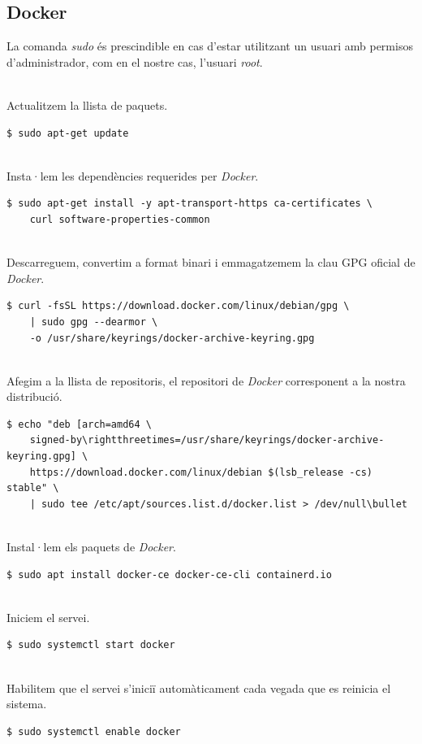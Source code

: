 \clearpage
\subsection*{\gls{Docker}}\label{subsec:docker-installation}

\begin{tcolorbox}[colback=red!5!white, colframe=red!75!black, title=sudo]
    La comanda \textit{sudo} és prescindible en cas d'estar utilitzant un usuari amb permisos d'administrador, com en el nostre cas, l'usuari \textit{root}.
\end{tcolorbox}

\noindent \\
Actualitzem la llista de paquets.
\begin{verbatim}
$ sudo apt-get update
\end{verbatim}

\noindent \\
Insta·lem les dependències requerides per \textit{\gls{Docker}}.
\begin{verbatim}
$ sudo apt-get install -y apt-transport-https ca-certificates \
    curl software-properties-common
\end{verbatim}

\noindent \\
Descarreguem, convertim a format binari i emmagatzemem la clau GPG oficial de \textit{\gls{Docker}}.
\begin{verbatim}
$ curl -fsSL https://download.docker.com/linux/debian/gpg \
    | sudo gpg --dearmor \
    -o /usr/share/keyrings/docker-archive-keyring.gpg
\end{verbatim}

\noindent \\
Afegim a la llista de repositoris, el repositori de \textit{\gls{Docker}} corresponent a la nostra distribució.
\begin{verbatim}
$ echo "deb [arch=amd64 \
    signed-by\rightthreetimes=/usr/share/keyrings/docker-archive-keyring.gpg] \
    https://download.docker.com/linux/debian $(lsb_release -cs) stable" \
    | sudo tee /etc/apt/sources.list.d/docker.list > /dev/null\bullet
\end{verbatim}

\clearpage

\noindent \\
Instal·lem els paquets de \textit{\gls{Docker}}.
\begin{verbatim}
$ sudo apt install docker-ce docker-ce-cli containerd.io
\end{verbatim}

\noindent \\
Iniciem el servei.
\begin{verbatim}
$ sudo systemctl start docker
\end{verbatim}

\noindent \\
Habilitem que el servei s'iniciï automàticament cada vegada que es reinicia el sistema.
\begin{verbatim}
$ sudo systemctl enable docker
\end{verbatim}

